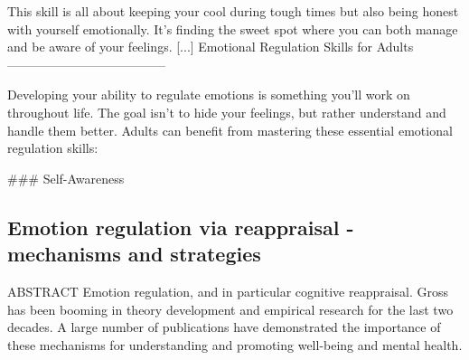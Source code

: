 \documentclass[12pt]{article}
\begin{document}
This skill is all about keeping your cool during tough times but also being honest with yourself emotionally. It’s finding the sweet spot where you can both manage and be aware of your feelings. [...] Emotional Regulation Skills for Adults
--------------------------------------

Developing your ability to regulate emotions is something you’ll work on throughout life. The goal isn’t to hide your feelings, but rather understand and handle them better. Adults can benefit from mastering these essential emotional regulation skills:

\#\#\# Self-Awareness\subsection{Emotion regulation via reappraisal - mechanisms and strategies}
ABSTRACT Emotion regulation, and in particular cognitive reappraisal. Gross has been booming in theory development and empirical research for the last two decades. A large number of publications have demonstrated the importance of these mechanisms for understanding and promoting well-being and mental health.
\end{document}
